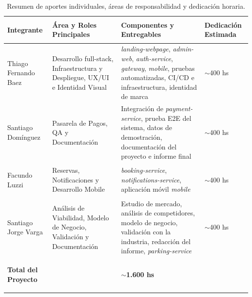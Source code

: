 \begin{table}[H]
\centering
\renewcommand{\arraystretch}{1.45}
\small
\begin{tabularx}{\textwidth}{>{\bfseries\raggedright\arraybackslash}p{2.8cm} >{\raggedright\arraybackslash}p{3.8cm} >{\raggedright\arraybackslash}X >{\centering\arraybackslash}p{1.9cm}}
\toprule
\textbf{Integrante} & \textbf{Área y Roles Principales} & \textbf{Componentes y Entregables} & \textbf{Dedicación Estimada} \\
\midrule
Thiago Fernando Baez & Desarrollo full-stack, Infraestructura y Despliegue, UX/UI e Identidad Visual & \textit{landing-webpage}, \textit{admin-web}, \textit{auth-service}, \textit{gateway}, \textit{mobile}, pruebas automatizadas, CI/CD e infraestructura, identidad de marca & $\sim$400 hs \\
\rowcolor{plgray}
Santiago Domínguez & Pasarela de Pagos, QA y Documentación & Integración de \textit{payment-service}, prueba E2E del sistema, datos de demostración, documentación del proyecto e informe final & $\sim$400 hs \\
Facundo Luzzi & Reservas, Notificaciones y Desarrollo Mobile & \textit{booking-service}, \textit{notifications-service}, aplicación móvil \textit{mobile} & $\sim$400 hs \\
\rowcolor{plgray}
Santiago Jorge Varga & Análisis de Viabilidad, Modelo de Negocio, Validación y Documentación & Estudio de mercado, análisis de competidores, modelo de negocio, validación con la industria, redacción del informe, \textit{parking-service} & $\sim$400 hs \\
\midrule
\textbf{Total del Proyecto} & \multicolumn{2}{>{\raggedright\arraybackslash}X}{\textbf{Desarrollo integral, validación y documentación de ParkLink}} & \textbf{$\sim$1.600 hs} \\
\bottomrule
\end{tabularx}
\caption{Resumen de aportes individuales, áreas de responsabilidad y dedicación horaria.}
\label{tab:aportes_individuales}
\end{table}
